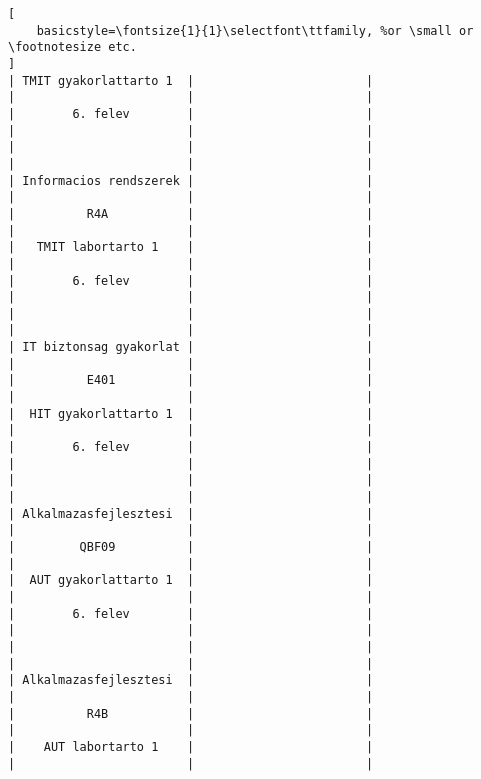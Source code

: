 \begin{lstlisting}[
    basicstyle=\fontsize{1}{1}\selectfont\ttfamily, %or \small or \footnotesize etc.
]
| TMIT gyakorlattarto 1  |                        |                        |                        |                        | 
|        6. felev        |                        |                        |                        |                        | 
|                        |                        |                        |                        |                        | 
| Informacios rendszerek |                        |                        |                        |                        | 
|          R4A           |                        |                        |                        |                        | 
|   TMIT labortarto 1    |                        |                        |                        |                        | 
|        6. felev        |                        |                        |                        |                        | 
|                        |                        |                        |                        |                        | 
| IT biztonsag gyakorlat |                        |                        |                        |                        | 
|          E401          |                        |                        |                        |                        | 
|  HIT gyakorlattarto 1  |                        |                        |                        |                        | 
|        6. felev        |                        |                        |                        |                        | 
|                        |                        |                        |                        |                        | 
| Alkalmazasfejlesztesi  |                        |                        |                        |                        | 
|         QBF09          |                        |                        |                        |                        | 
|  AUT gyakorlattarto 1  |                        |                        |                        |                        | 
|        6. felev        |                        |                        |                        |                        | 
|                        |                        |                        |                        |                        | 
| Alkalmazasfejlesztesi  |                        |                        |                        |                        | 
|          R4B           |                        |                        |                        |                        | 
|    AUT labortarto 1    |                        |                        |                        |                        | 

\end{lstlisting}
